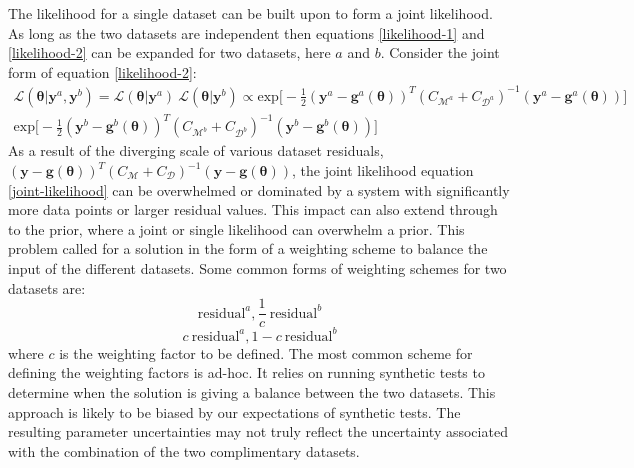 The likelihood for a single dataset can be built upon to form a joint likelihood. As long as the two datasets are independent then equations \ref{likelihood-1} and \ref{likelihood-2} can be expanded for two datasets, here $a$ and $b$. Consider the joint form of equation \ref{likelihood-2}:
\begin{multline}
\mathcal{L}(\bm{\theta}|\bm{y}^a,\bm{y}^b) = \mathcal{L}(\bm{\theta}|\bm{y}^a)\ \mathcal{L}(\bm{\theta}|\bm{y}^b)
\propto \text{exp}\bigg[-\frac{1}{2}(\bm{y}^a-\bm{g}^a(\bm{\theta}))^T(C_{\mathcal{M}^a}+C_{\mathcal{D}^a})^{-1}(\bm{y}^a-\bm{g}^a(\bm{\theta}))\bigg]\ \\
\text{exp}\bigg[-\frac{1}{2}(\bm{y}^b-\bm{g}^b(\bm{\theta}))^T(C_{\mathcal{M}^b}+C_{\mathcal{D}^b})^{-1}(\bm{y}^b-\bm{g}^b(\bm{\theta}))\bigg]
\label{joint-likelihood}
\end{multline}
As a result of the diverging scale of various dataset residuals, $(\bm{y}-\bm{g}(\bm{\theta}))^T(C_{\mathcal{M}}+C_{\mathcal{D}})^{-1}(\bm{y}-\bm{g}(\bm{\theta}))$, the joint likelihood equation \ref{joint-likelihood} can be overwhelmed or dominated by a system with significantly more data points or larger residual values. This impact can also extend through to the prior, where a joint or single likelihood can overwhelm a prior. This problem called for a solution in the form of a weighting scheme to balance the input of the different datasets. Some common forms of weighting schemes for two datasets are:
\begin{equation}
\text{residual}^a, \frac{1}{c}\ \text{residual}^b
\end{equation}
\begin{equation}
c\ \text{residual}^a, 1-c\ \text{residual}^b
\end{equation}
where $c$ is the weighting factor to be defined. The most common scheme for defining the weighting factors is ad-hoc. It relies on running synthetic tests to determine when the solution is giving a balance between the two datasets. This approach is likely to be biased by our expectations of synthetic tests. The resulting parameter uncertainties may not truly reflect the uncertainty associated with the combination of the two complimentary datasets. \par


